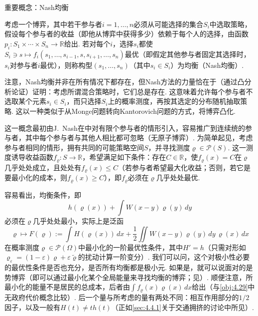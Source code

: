 \begin{sourcebox}{重要概念：Nash均衡}\label{box:7.3}
\begin{definition*}
考虑一个博弈，其中若干参与者$i=1,\ldots,n$必须从可能选择的集合$S_i$中选取策略，假设每个参与者的收益（即他从博弈中获得多少）依赖于每个人的选择，由函数$p_i:S_1\times\cdots\times S_n\to\mathbb R$给出. 若对每个$i$，选择$s_i$都使$S_i\ni s\mapsto f_i(s_1,\ldots,s_{i-1},s,s_{i+1},\ldots,s_n)$最优（即假定其他参与者固定其选择时，$s_i$对参与者$i$最优），则称构型$(s_1,\ldots,s_n)$（其中$s_i\in S_i$）为均衡（Nash均衡）.
\end{definition*}
注意，Nash均衡并非在所有情况下都存在，但Nash方法的力量恰在于（通过凸分析论证）证明：考虑所谓混合策略时，它们总是存在. 这意味着允许每个参与者不选取某个元素$s_i\in S_i$，而只选择$S_i$上的概率测度，再按其选定的分布随机抽取策略. 这以一种类似于从Monge问题转向Kantorovich问题的方式，将博弈凸化.

这一概念最初由J.~Nash在\cite{b243,b244}中对有限个参与者的情形引入，容易推广到连续统的参与者，其中每个参与者与其他人相比都可忽略（无原子博弈）. 为简单起见，考虑参与者相同的情形，拥有共同的可能策略空间$S$，并寻找测度$\varrho\in\mathscr P(S)$. 这一测度诱导收益函数$f_\varrho:S\to\mathbb R$，希望满足如下条件：存在$C\in\mathbb R$，使$f_\varrho(x)=C$在$\varrho$几乎处处成立，且处处有$f_\varrho(x)\leq C$（若参与者希望最大化收益；否则，若它是要最小化的成本，则$f_\varrho(x)\geq C$），即$f_\varrho$必须在$\varrho$几乎处处最优.
\end{sourcebox}

容易看出，均衡条件，即
\[
 h(\varrho(x))+\int W(x-y)\varrho(y)\,dy
\]
必须在$\varrho$几乎处处最小，实际上是泛函
\[
 \varrho\mapsto F(\varrho):=\int H(\varrho(x))\,dx
             +\frac12\iint W(x-y)\varrho(y)\,dy\,\varrho(x)\,dx
\]
在概率测度$\varrho\in\mathscr P(\Omega)$中最小化的一阶最优性条件，其中$H'=h$（只需对形如$\varrho_\varepsilon=(1-\varepsilon)\varrho+\varepsilon\widetilde\varrho$的扰动计算一阶变分）. 我们可以问，这个对极小性必要的最优性条件是否也充分，是否所有均衡都是极小元. 如果是，就可以说面对的是势博弈（即可以通过最小化某个全局能量来寻找均衡的博弈；见\cite{b238}）. 顺便注意，所最小化的能量不是居民的总成本，后者由$\int f_\varrho(x)\varrho(x)\,dx$给出（与\autoref{obj:4.29}中\label{idx:i119-p282}
无政府代价概念比较）. 后一个量与所考虑的量有两处不同：相互作用部分的$1/2$因子，以及一般有$H(t)\ne th(t)$（正如\autoref{sec:4.4.1}关于交通拥挤的讨论中所见）.

